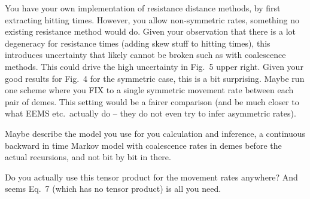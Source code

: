 \begin{point}{}
    You have your own implementation of resistance distance methods, by first
    extracting hitting times. However, you allow non-symmetric rates, something
    no existing resistance method would do. Given your observation that there
    is a lot degeneracy for resistance times (adding skew stuff to hitting
    times), this introduces uncertainty that likely cannot be broken such as
    with coalescence methods. This could drive the high uncertainty in Fig.\ 5
    upper right. Given your good results for Fig.\ 4 for the symmetric case,
    this is a bit surprising. Maybe run one scheme where you FIX to a single
    symmetric movement rate between each pair of demes. This setting would be a
    fairer comparison (and be much closer to what EEMS etc.\ actually do -- they
    do not even try to infer asymmetric rates).
\end{point}



\begin{point}{}
    Maybe describe the model you use for you calculation and inference, a
    continuous backward in time Markov model with coalescence rates in demes
    before the actual recursions, and not bit by bit in there.
\end{point}


\begin{point}{\revref}
    Do you actually use this tensor product for the movement
    rates anywhere? And seems Eq.\ 7 (which has no tensor product) is all you
    need.
\end{point}


